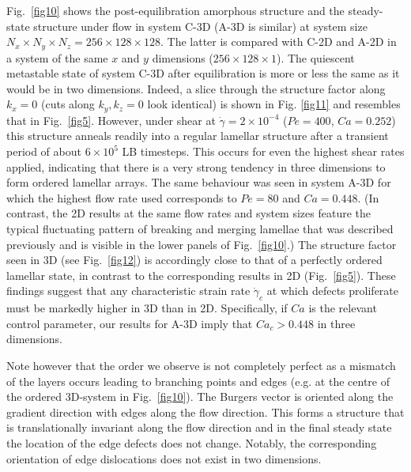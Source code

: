\documentclass[8.5pt,twoside,twocolumn]{article}
\newcommand{\e}[1]{\times10^{#1}}
\begin{document}
Fig.~\ref{fig10} shows the post-equilibration amorphous structure and the steady-state structure under flow in system C-3D (A-3D is similar) at system size $N_x\times N_y \times N_z=256\times128\times128$. The latter is compared with C-2D and A-2D in a system of the same $x$ and $y$ dimensions ($256\times128\times1$).  The quiescent metastable state of system C-3D after equilibration is more or less the same as it would be in two dimensions. 
Indeed, a slice through the structure factor along $k_x=0$ (cuts along $k_y,k_z=0$ look identical) is shown in Fig. \ref{fig11} and resembles that in
Fig.~\ref{fig5}.
However, under shear at $\dot\gamma = 2\times 10^{-4}$ ($Pe = 400$, $Ca = 0.252$) this structure anneals readily into a regular lamellar structure after a transient period of about $6\e{5}$ LB timesteps. This occurs for even the highest shear rates applied, indicating that there is a very strong tendency in three dimensions to form ordered lamellar arrays. The same behaviour was seen in system A-3D for which the highest flow rate used corresponds to $Pe = 80$ and $Ca = 0.448$. (In contrast, the 2D results at the same flow rates and system sizes feature the typical fluctuating pattern of breaking and merging lamellae that was described previously and is visible in the lower panels of Fig.~\ref{fig10}.) The structure factor seen in 3D (see Fig.~\ref{fig12}) is accordingly close to that of a perfectly ordered lamellar state, in contrast to the corresponding results in 2D (Fig.~\ref{fig5}).
These findings suggest that any characteristic strain rate $\dot\gamma_c$ at which defects proliferate must be markedly higher in 3D than in 2D. Specifically, if $Ca$ is the relevant control parameter, our results for A-3D imply that $Ca_c > 0.448 $ in three dimensions.

Note however that the order we observe is not completely perfect as a mismatch of the layers occurs leading to branching points and edges (e.g. at the centre of the ordered 3D-system in Fig.~\ref{fig10}). 
The Burgers vector is oriented along the gradient direction with edges along the flow direction.
This forms a structure that is translationally invariant along the flow direction and in the final steady state the location of the edge defects does not change. Notably, the corresponding orientation of edge dislocations does not exist in two dimensions.
\end{document}
